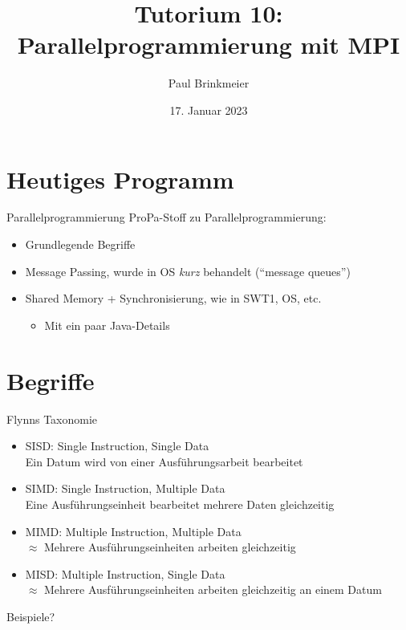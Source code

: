 \documentclass{beamer}
\title{Tutorium 10: Parallelprogrammierung mit MPI}
\author{Paul Brinkmeier}
\institute{Tutorium Programmierparadigmen am KIT}
\date{17. Januar 2023}
\begin{document}
\begin{frame}
	\titlepage
\end{frame}


\section{Heutiges Programm}

\begin{frame}{Parallelprogrammierung}
	ProPa-Stoff zu Parallelprogrammierung:

	\begin{itemize}
		\item Grundlegende Begriffe
		\item Message Passing, wurde in OS \emph{kurz} behandelt (\enquote{message queues})
		\item Shared Memory + Synchronisierung, wie in SWT1, OS, etc.
		\begin{itemize}
			\item Mit ein paar Java-Details
		\end{itemize}
	\end{itemize}
\end{frame}

\section{Begriffe}

\begin{frame}{Flynns Taxonomie}
	\begin{itemize}
		\item SISD: Single Instruction, Single Data\\
			{\footnotesize Ein Datum wird von einer Ausführungsarbeit bearbeitet}
		\item SIMD: Single Instruction, Multiple Data\\
			{\footnotesize Eine Ausführungseinheit bearbeitet mehrere Daten gleichzeitig}
		\item MIMD: Multiple Instruction, Multiple Data\\
			{\footnotesize $\approx$ Mehrere Ausführungseinheiten arbeiten gleichzeitig}
		\item MISD: Multiple Instruction, Single Data\\
			{\footnotesize $\approx$ Mehrere Ausführungseinheiten arbeiten gleichzeitig an einem Datum}
	\end{itemize}

	\pause
	Beispiele?
\end{frame}
\end{document}
